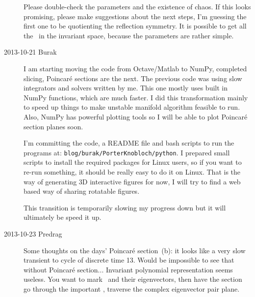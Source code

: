 \begin{description}
Please double-check the parameters and the existence of chaos. If this looks
promising, please make suggestions about the next steps, I'm guessing the
first one to be quotienting the reflection symmetry. It is possible to get
all the \eqva\ in the invariant space, because the parameters are rather simple.



\item[2013-10-21 Burak]
I am starting moving the code from Octave/Matlab to NumPy, completed slicing,
Poincar\'e sections are the next. The previous code was using slow integrators
and solvers written by me. This one mostly uses built in NumPy functions,
which are much faster. I did this transformation mainly to speed up things
to make unstable manifold algorithm feasible to run. Also, NumPy has powerful
plotting tools so I will be able to plot Poincar\'e section planes soon.

I'm committing the code, a README file and bash scripts to run the programs at:
\texttt{blog/burak/PorterKnobloch/python}.
I prepared small scripts to install the required packages for Linux users,
so if you want to re-run something, it should be really easy to do it on Linux.
That is the way of generating 3D interactive figures for now, I will try to
find a web based way of sharing rotatable figures.

This transition is temporarily slowing my progress down but it will ultimately
be speed it up.

\item[2013-10-23 Predrag] Some thoughts on the days'
Poincar\'e section \,(b):
it looks like a very slow
transient to cycle of discrete time 13. Would be impossible to see
that without Poincar\'e section... Invariant polynomial representation
seems useless.
You want to mark \reqva\ and their eigenvectors, then have
the section go through the important \reqv, traverse the complex
eigenvector pair plane.


\end{description}

